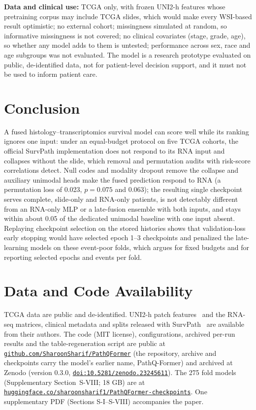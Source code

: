 \documentclass[journal]{IEEEtran}
\newcommand{\weblink}[2]{\href{#1}{\nolinkurl{#2}}}
\begin{document}
\textbf{Data and clinical use:} TCGA only, with frozen UNI2-h features whose pretraining corpus may include TCGA slides, which would make every WSI-based result optimistic; no external cohort; missingness simulated at random, so informative missingness is not covered; no clinical covariates (stage, grade, age), so whether any model adds to them is untested; performance across sex, race and age subgroups was not evaluated. The model is a research prototype evaluated on public, de-identified data, not for patient-level decision support, and it must not be used to inform patient care.

\section{Conclusion}
\label{sec:conclusion}
A fused histology--transcriptomics survival model can score well while its ranking ignores one input: under an equal-budget protocol on five TCGA cohorts, the official SurvPath implementation does not respond to its RNA input and collapses without the slide, which removal and permutation audits with risk-score correlations detect. Null codes and modality dropout remove the collapse and auxiliary unimodal heads make the fused prediction respond to RNA (a permutation loss of 0.023, $p = 0.075$ and $0.063$); the resulting single checkpoint serves complete, slide-only and RNA-only patients, is not detectably different from an RNA-only MLP or a late-fusion ensemble with both inputs, and stays within about 0.05 of the dedicated unimodal baseline with one input absent. Replaying checkpoint selection on the stored histories shows that validation-loss early stopping would have selected epoch 1--3 checkpoints and penalized the late-learning models on these event-poor folds, which argues for fixed budgets and for reporting selected epochs and events per fold.

\section*{Data and Code Availability}
TCGA data are public and de-identified. UNI2-h patch features~\cite{uni2hfeatures} and the RNA-seq matrices, clinical metadata and splits released with SurvPath~\cite{jaume2024survpath} are available from their authors. The code (MIT license), configurations, archived per-run results and the table-regeneration script are public at \weblink{https://github.com/SharoonSharif/PathQFormer}{github.com/SharoonSharif/PathQFormer} (the repository, archive and checkpoints carry the model's earlier name, PathQ-Former) and archived at Zenodo (version 0.3.0, \weblink{https://doi.org/10.5281/zenodo.23245611}{doi:10.5281/zenodo.23245611}). The 275 fold models (Supplementary Section~S-VIII; 18 GB) are at \weblink{https://huggingface.co/sharoonsharif1/PathQFormer-checkpoints}{huggingface.co/sharoonsharif1/PathQFormer-checkpoints}. One supplementary PDF (Sections S-I--S-VIII) accompanies the paper.
\end{document}
